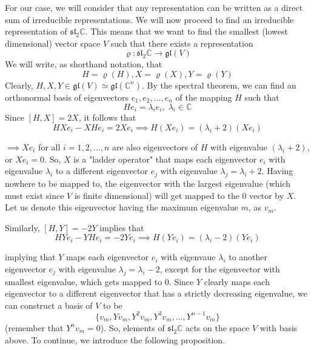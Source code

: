 \documentclass{article}
\begin{document}
    For our case, we will consider that any representation can be written as a direct sum of irreducible representations. We will now proceed to find an irreducible representation of $\mathfrak{sl}_2 \mathbb{C}$. This means that we want to find the smallest (lowest dimensional) vector space $V$ such that there exists a representation
    \begin{equation}
      \varrho: \mathfrak{sl}_2 \mathbb{C} \longrightarrow \mathfrak{gl}(V)
    \end{equation}
    We will write, as shorthand notation, that 
    \begin{equation}
      H = \varrho(H), X = \varrho(X), Y = \varrho(Y)
    \end{equation}
    Clearly, $H, X, Y \in \mathfrak{gl}(V) \simeq \mathfrak{gl}(\mathbb{C}^n)$. By the spectral theorem, we can find an orthonormal basis of eigenvectors $e_1, e_2, ..., e_n$ of the mapping $H$ such that
    \begin{equation}
      H e_i = \lambda_i e_i, \; \lambda_i \in \mathbb{C}
    \end{equation}
    Since $[H,X] = 2X$, it follows that
    \begin{equation}
      HX e_i - X H e_i = 2X e_i \implies H (X e_i) = (\lambda_i + 2) (X e_i)
    \end{equation}

    $\implies Xe_i$ for all $i = 1, 2, ..., n$ are also eigenvectors of $H$ with eigenvalue $(\lambda_i + 2)$, or $X e_i = 0$. So, $X$ is a "ladder operator" that maps each eigenvector $e_i$ with eigenvalue $\lambda_i$ to a different eigenvector $e_j$ with eigenvalue $\lambda_j = \lambda_i + 2$. Having nowhere to be mapped to, the eigenvector with the largest eigenvalue (which must exist since $V$ is finite dimensional) will get mapped to the $0$ vector by $X$. Let us denote this eigenvector having the maximum eigenvalue $m$, as $v_m$. 

    Similarly, $[H,Y] = -2Y$ implies that
    \begin{equation}
      HY e_i - YH e_i = -2Y e_i \implies H(Y e_i) = (\lambda_i - 2)(Y e_i)
    \end{equation}

    implying that $Y$ maps each eigenvector $e_i$ with eigenvaue $\lambda_i$ to another eigenvector $e_j$ with eigenvalue $\lambda_j = \lambda_i - 2$, except for the eigenvector with smallest eigenvalue, which gets mapped to $0$. Since $Y$ clearly maps each eigenvector to a different eigenvector that has a strictly decreasing eigenvalue, we can construct a basis of $V$ to be
    \begin{equation}
      \{v_m, Y v_m, Y^2 v_m, Y^3 v_m, ..., Y^{n-1} v_m\}
    \end{equation}
    (remember that $Y^n v_m = 0$). So, elements of $\mathfrak{sl}_2 \mathbb{C}$ acts on the space $V$ with basis above. To continue, we introduce the following proposition. 
\end{document}

